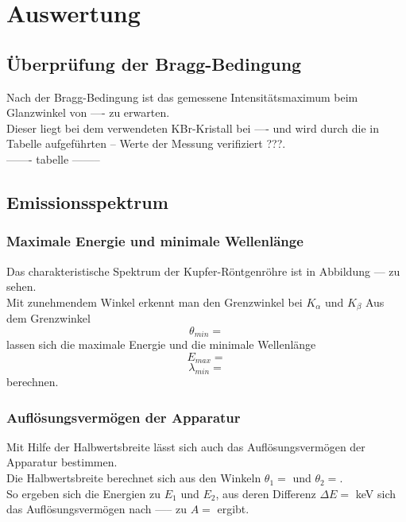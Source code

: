 \section{Auswertung}
\label{sec:Auswertung}



\subsection{Überprüfung der Bragg-Bedingung}
\label{subsec:bragg}
Nach der Bragg-Bedingung ist das gemessene Intensitätsmaximum beim Glanzwinkel von ---- zu erwarten. \\
Dieser liegt bei dem verwendeten KBr-Kristall bei ---- und wird durch die in Tabelle aufgeführten -- Werte 
der Messung verifiziert ???. \\

------- tabelle --------



\subsection{Emissionsspektrum}
\label{subsec:emissionsspektrum}


\subsubsection*{Maximale Energie und minimale Wellenlänge}

Das charakteristische Spektrum der Kupfer-Röntgenröhre ist in Abbildung --- zu sehen.\\
Mit zunehmendem Winkel erkennt man den Grenzwinkel bei  $K_{\alpha}$ und $K_{\beta}$ 
Aus dem Grenzwinkel \begin{equation*}
  \theta_{min} = 
\end{equation*}
lassen sich die maximale Energie und die minimale Wellenlänge 
\begin{equation*}
  E_{max} = 
\end{equation*}
\begin{equation*}
  \lambda_{min} =
\end{equation*} 
berechnen.


\subsubsection*{Auflösungsvermögen der Apparatur}

Mit Hilfe der Halbwertsbreite lässt sich auch das Auflösungsvermögen der Apparatur bestimmen. \\
Die Halbwertsbreite berechnet sich aus den Winkeln $\theta_1 = $ und $\theta_2 = $.\\
So ergeben sich die Energien zu $E_1$ und $E_2$, aus deren Differenz $\Delta E = $ keV sich das Auflösungsvermögen
nach ----- zu $A = $ ergibt.


